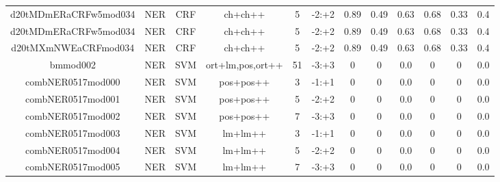 \documentclass[a4paper]{article}
\begin{document}
\begin{landscape}
\begin{center}
\begin{tabular}{ |c|c|c|c|c|c|c|c|c|c|c|c|}
 
 	
 	\small{ d20tMDmERaCRFw5mod034 } & \small{ NER} & \small{  CRF }  & ch+ch++  &  5 &  \small{  -2:+2 }  &  0.89 & 0.49 & 0.63  &  0.68 & 0.33 & 0.4 \\
 	

 
 	
 	\small{ d20tMDmERaCRFw5mod034 } & \small{ NER} & \small{  CRF }  & ch+ch++  &  5 &  \small{  -2:+2 }  &  0.89 & 0.49 & 0.63  &  0.68 & 0.33 & 0.4 \\
 	

 
 	
 	\small{ d20tMXmNWEaCRFmod034 } & \small{ NER} & \small{  CRF }  & ch+ch++  &  5 &  \small{  -2:+2 }  &  0.89 & 0.49 & 0.63  &  0.68 & 0.33 & 0.4 \\
 	

 
 	
 	\small{ bmmod002 } & \small{ NER} & \small{  SVM }  & ort+lm,pos,ort++  &  51 &  \small{  -3:+3 }  &  0 & 0 & 0.0  &  0 & 0 & 0.0 \\
 	

 
 	
 	\small{ combNER0517mod000 } & \small{ NER} & \small{  SVM }  & pos+pos++  &  3 &  \small{  -1:+1 }  &  0 & 0 & 0.0  &  0 & 0 & 0.0 \\
 	

 
 	
 	\small{ combNER0517mod001 } & \small{ NER} & \small{  SVM }  & pos+pos++  &  5 &  \small{  -2:+2 }  &  0 & 0 & 0.0  &  0 & 0 & 0.0 \\
 	

 
 	
 	\small{ combNER0517mod002 } & \small{ NER} & \small{  SVM }  & pos+pos++  &  7 &  \small{  -3:+3 }  &  0 & 0 & 0.0  &  0 & 0 & 0.0 \\
 	

 
 	
 	\small{ combNER0517mod003 } & \small{ NER} & \small{  SVM }  & lm+lm++  &  3 &  \small{  -1:+1 }  &  0 & 0 & 0.0  &  0 & 0 & 0.0 \\
 	

 
 	
 	\small{ combNER0517mod004 } & \small{ NER} & \small{  SVM }  & lm+lm++  &  5 &  \small{  -2:+2 }  &  0 & 0 & 0.0  &  0 & 0 & 0.0 \\
 	

 
 	
 	\small{ combNER0517mod005 } & \small{ NER} & \small{  SVM }  & lm+lm++  &  7 &  \small{  -3:+3 }  &  0 & 0 & 0.0  &  0 & 0 & 0.0 \\
 	


\end{tabular}
\end{center}
\end{landscape}
\end{document}
